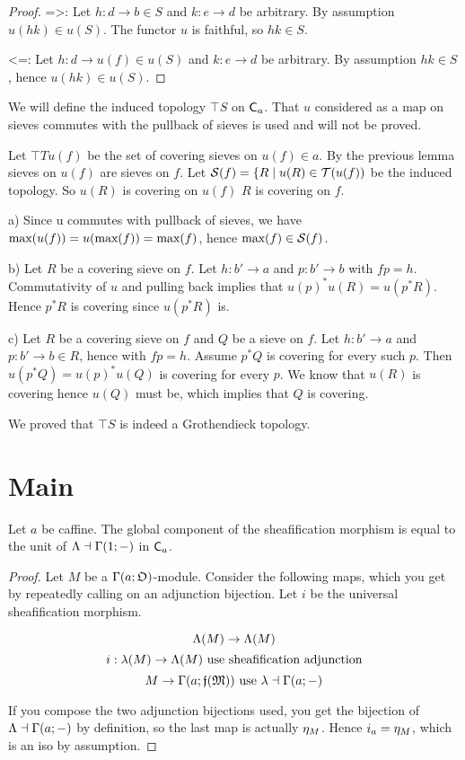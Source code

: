 \begin{proof}
=>:
Let $h: d \rightarrow b \in S$ 
and $k: e \rightarrow d$ be arbitrary.
By assumption $u(hk)\in u(S)$.
The functor $u$ is faithful, so $hk \in S$.

<=:
Let $h: d \rightarrow u(f) \in u(S)$ 
and $k: e \rightarrow d$ be arbitrary.
By assumption $hk \in S$, hence $u(hk) \in u(S)$.
\end{proof}

We will define the induced topology $\top{S}$ on ${\mathsf{C}}_{a}$.
That $u$ considered as a map on sieves commutes with the pullback of sieves is used and will not be proved.

\begin{definition}
Let $\top{T}{u(f)}$ be the set of covering sieves on $u(f) \in a$.
By the previous lemma sieves on $u(f)$ are sieves on $f$.
Let $\top{S}{f} = \{R \suchthat u(R) \in \top{T}{u(f)}$ be the induced topology.
So $u(R)$ is covering on $u(f)$ \iff $R$ is covering on $f$.

a) Since u commutes with pullback of sieves, 
we have $\mbox{max}(u(f)) = u(\mbox{max}(f)) = \mbox{max}(f)$,
hence $\maxsieve{f} \in \top{S}{f}$.

b) Let $R$ be a covering sieve on $f$.
Let $h:b'\rightarrow a$
and $p:b' \rightarrow b$ with $fp = h$.
Commutativity of $u$ and pulling back implies that $u(p)^*u(R) = u(p^*R)$.
Hence $p^*R$ is covering since $u(p^*R)$ is.

c) Let $R$ be a covering sieve on $f$
and $Q$ be a sieve on $f$.
Let $h:b'\rightarrow a$
and $p:b' \rightarrow b \in R$,
hence with $fp = h$.
Assume $p^*Q$ is covering for every such $p$.
Then $u(p^*Q) = u(p)^*u(Q)$ is covering for every $p$.
We know that $u(R)$ is covering hence $u(Q)$ must be, which implies that $Q$ is covering.

We proved that $\top{S}$ is indeed a Grothendieck topology.
\end{definition}

\section*{Main}

\begin{lemma}
Let $a$ be caffine.
The global component of the sheafification morphism is equal to the unit of $\adj{\stilde}{\globalsections}$ in ${\mathsf{C}}_{a}$.
\end{lemma}

\begin{proof}
Let $M$ be a $\sections{a}{O}$-module.
Consider the following maps, which you get by repeatedly calling on an adjunction bijection.
Let $i$ be the universal sheafification morphism.

\[\stilde(M) \rightarrow \stilde(M)\]
\[	i : \pstilde(M) \rightarrow \stilde(M) \mbox{ use sheafification adjunction}\]
\[ M \rightarrow \sections{a}{\stilde(M)} \mbox{ use } \adj{\pstilde}{\sections{a}}\]

If you compose the two adjunction bijections used, 
you get the bijection of $\adj{\stilde}{\sections{a}}$
by definition, so the last map is actually $\eta_M$.
Hence $i_a = \eta_{M}$, which is an iso by assumption.
\end{proof}

